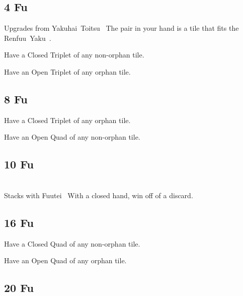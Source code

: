\subsection{4 Fu}\label{core:ssec:4-fu}

	{\upgradesfrom Upgrades from Yakuhai~Toitsu~}
	{The pair in your hand is a tile that fits the Renfuu~Yaku~.}

	{}
	{Have a Closed Triplet of any non-orphan tile.}

	{}
	{Have an Open Triplet of any orphan tile.}


\subsection{8 Fu}\label{core:ssec:8-fu}

	{}
	{Have a Closed Triplet of any orphan tile.}

	{}
	{Have an Open Quad of any non-orphan tile.}


\subsection{10 Fu}\label{core:ssec:10-fu}

	{\closedhand \\
	\upgradesfrom Stacks with Fuutei~}
	{With a closed hand, win off of a discard.}


\subsection{16 Fu}\label{core:ssec:16-fu}

	{}
	{Have a Closed Quad of any non-orphan tile.}

	{}
	{Have an Open Quad of any orphan tile.}


\subsection{20 Fu}\label{core:ssec:20-fu}

